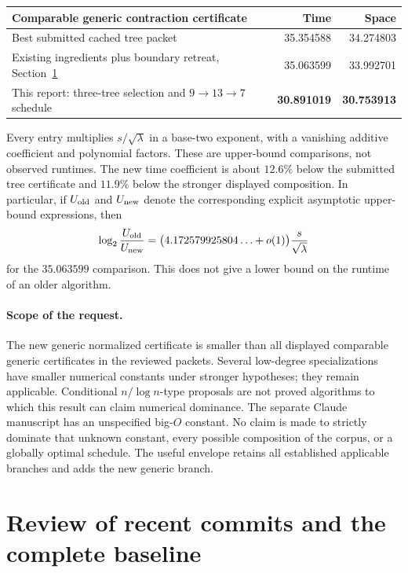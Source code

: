 \documentclass[11pt]{article}
\theoremstyle{remark}\newtheorem{remark}[theorem]{Remark}
\begin{document}
\begin{center}
\begin{tabular}{p{8.1cm}rr}
\toprule
Comparable generic contraction certificate & Time & Space\\
\midrule
Best submitted cached tree packet \cite{tree} &35.354588&34.274803\\
Existing ingredients plus boundary retreat, Section~\ref{sec:baseline} &35.063599&33.992701\\
This report: three-tree selection and $9\to13\to7$ schedule &\textbf{30.891019}&\textbf{30.753913}\\
\bottomrule
\end{tabular}
\end{center}
Every entry multiplies $s/\sqrt\lambda$ in a base-two exponent, with a
vanishing additive coefficient and polynomial factors. These are upper-bound
comparisons, not observed runtimes. The new time coefficient is about $12.6\%$
below the submitted tree certificate and $11.9\%$ below the stronger displayed
composition. In particular, if $U_{\rm old}$ and $U_{\rm new}$ denote the
corresponding explicit asymptotic upper-bound expressions, then
\[
 \log_2\frac{U_{\rm old}}{U_{\rm new}}
 =\bigl(4.172579925804\ldots+o(1)\bigr)\frac{s}{\sqrt\lambda}
\]
for the $35.063599$ comparison. This does not give a lower bound on the
runtime of an older algorithm.

\paragraph{Scope of the request.}
The new generic normalized certificate is smaller than all displayed
comparable generic certificates in the reviewed packets. Several low-degree
specializations have smaller numerical constants under stronger hypotheses;
they remain applicable. Conditional $n/\log n$-type proposals are not proved
algorithms to which this result can claim numerical dominance. The separate
Claude manuscript has an unspecified big-$O$ constant. No claim is made to
strictly dominate that unknown constant, every possible composition of the
corpus, or a globally optimal schedule. The useful envelope retains all
established applicable branches and adds the new generic branch.

\section{Review of recent commits and the complete baseline}
\label{sec:baseline}
\end{document}
